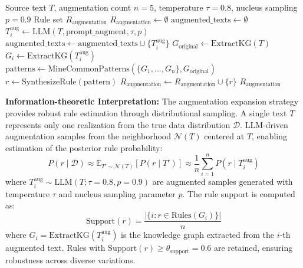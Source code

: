 \documentclass[runningheads]{llncs}
\begin{document}
\begin{algorithm}[H]
\caption{Augmentation Expansion Strategy}
\label{alg:augmentation_expansion}
\begin{algorithmic}[1]
    \Require Source text $T$, augmentation count $n = 5$, temperature $\tau = 0.8$, nucleus sampling $p = 0.9$
    \Ensure Rule set $R_{\text{augmentation}}$
    \State $R_{\text{augmentation}} \leftarrow \emptyset$
    \State $\text{augmented\_texts} \leftarrow \emptyset$
        \State $T_i^{\text{aug}} \leftarrow \text{LLM}(T, \text{prompt\_augment}, \tau, p)$
        \State $\text{augmented\_texts} \leftarrow \text{augmented\_texts} \cup \{T_i^{\text{aug}}\}$
    \EndFor
    \State $G_{\text{original}} \leftarrow \text{ExtractKG}(T)$
        \State $G_i \leftarrow \text{ExtractKG}(T_i^{\text{aug}})$
    \EndFor
    \State $\text{patterns} \leftarrow \text{MineCommonPatterns}(\{G_1, ..., G_n\}, G_{\text{original}})$
         
            \State $r \leftarrow \text{SynthesizeRule}(\text{pattern})$
            \State $R_{\text{augmentation}} \leftarrow R_{\text{augmentation}} \cup \{r\}$
        \EndIf
    \EndFor
    \Return $R_{\text{augmentation}}$
\end{algorithmic}
\end{algorithm}

\textbf{Information-theoretic Interpretation:} The augmentation expansion strategy provides robust rule estimation through distributional sampling. A single text $T$ represents only one realization from the true data distribution $\mathcal{D}$. LLM-driven augmentation samples from the neighborhood $\mathcal{N}(T)$ centered at $T$, enabling estimation of the posterior rule probability:
\begin{equation}
P(r \mid \mathcal{D}) \approx \mathbb{E}_{T' \sim \mathcal{N}(T)} [P(r \mid T')] \approx \frac{1}{n} \sum_{i=1}^{n} P(r \mid T_i^{\text{aug}})
\end{equation}
where $T_i^{\text{aug}} \sim \text{LLM}(T; \tau=0.8, p=0.9)$ are augmented samples generated with temperature $\tau$ and nucleus sampling parameter $p$. The rule support is computed as:
\begin{equation}
\text{Support}(r) = \frac{|\{i : r \in \text{Rules}(G_i)\}|}{n}
\end{equation}
where $G_i = \text{ExtractKG}(T_i^{\text{aug}})$ is the knowledge graph extracted from the $i$-th augmented text. Rules with $\text{Support}(r) \geq \theta_{\text{support}} = 0.6$ are retained, ensuring robustness across diverse variations.
\end{document}
